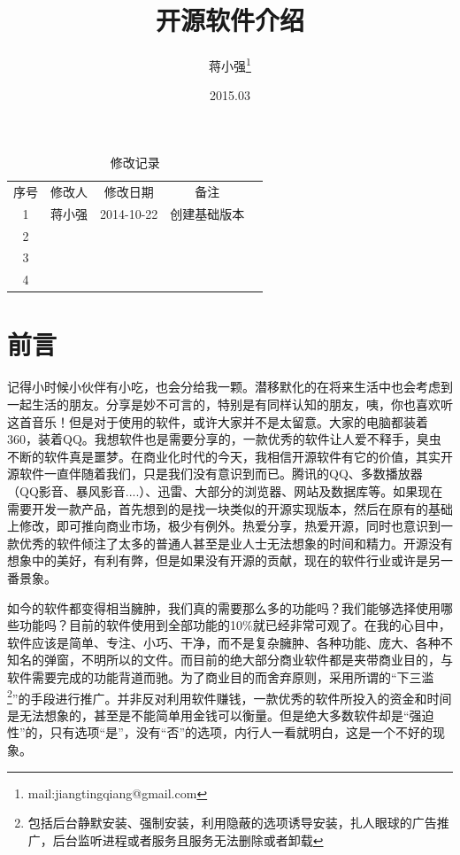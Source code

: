 \documentclass{book}
\begin{document}
\title{开源软件介绍}		
\author{蒋小强\footnote{mail:jiangtingqiang@gmail.com}}
\date{2015.03}	

\maketitle %
\clearpage

\begin{table}\caption{修改记录}					
	\medskip
	\centering		
	\begin{tabular}{|c|c|c|c|c|}
		\hline
		\multirow{1}{*}{序号}
		& \multicolumn{1}{|c|}{修改人}  
		& \multicolumn{1}{|c|}{修改日期} 
		& \multicolumn{1}{|c|}{备注}\\			
		\cline{1-4}
		1 & 蒋小强 & 2014-10-22 & 创建基础版本\\
		\hline
		2 & & &\\
		\hline
		3 & & &\\
		\hline
		4 & & &\\
		\hline
	\end{tabular}
\end{table}
\clearpage
\section{前言}

记得小时候小伙伴有小吃，也会分给我一颗。潜移默化的在将来生活中也会考虑到一起生活的朋友。分享是妙不可言的，特别是有同样认知的朋友，咦，你也喜欢听这首音乐！但是对于使用的软件，或许大家并不是太留意。大家的电脑都装着360，装着QQ。我想软件也是需要分享的，一款优秀的软件让人爱不释手，臭虫不断的软件真是噩梦。在商业化时代的今天，我相信开源软件有它的价值，其实开源软件一直伴随着我们，只是我们没有意识到而已。腾讯的QQ、多数播放器（QQ影音、暴风影音....）、迅雷、大部分的浏览器、网站及数据库等。如果现在需要开发一款产品，首先想到的是找一块类似的开源实现版本，然后在原有的基础上修改，即可推向商业市场，极少有例外。热爱分享，热爱开源，同时也意识到一款优秀的软件倾注了太多的普通人甚至是业人士无法想象的时间和精力。开源没有想象中的美好，有利有弊，但是如果没有开源的贡献，现在的软件行业或许是另一番景象。	

如今的软件都变得相当臃肿，我们真的需要那么多的功能吗？我们能够选择使用哪些功能吗？目前的软件使用到全部功能的10\%就已经非常可观了。在我的心目中，软件应该是简单、专注、小巧、干净，而不是复杂臃肿、各种功能、庞大、各种不知名的弹窗，不明所以的文件。而目前的绝大部分商业软件都是夹带商业目的，与软件需要完成的功能背道而驰。为了商业目的而舍弃原则，采用所谓的“下三滥\footnote{包括后台静默安装、强制安装，利用隐蔽的选项诱导安装，扎人眼球的广告推广，后台监听进程或者服务且服务无法删除或者卸载}”的手段进行推广。并非反对利用软件赚钱，一款优秀的软件所投入的资金和时间是无法想象的，甚至是不能简单用金钱可以衡量。但是绝大多数软件却是“强迫性”的，只有选项“是”，没有“否”的选项，内行人一看就明白，这是一个不好的现象。
\end{document}
